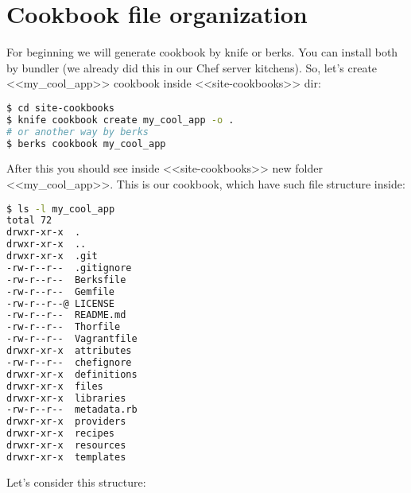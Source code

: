 \section{Cookbook file organization}
\label{sec:cookbook-files}

For beginning we will generate cookbook by knife or berks. You can install both by bundler (we already did this in our Chef server kitchens). So, let's create <<my\_cool\_app>> cookbook inside <<site-cookbooks>> dir:

\begin{lstlisting}[language=Bash,label=lst:cookbook-organization1]
$ cd site-cookbooks
$ knife cookbook create my_cool_app -o .
# or another way by berks
$ berks cookbook my_cool_app
\end{lstlisting}

After this you should see inside <<site-cookbooks>> new folder <<my\_cool\_app>>. This is our cookbook, which have such file structure inside:

\begin{lstlisting}[language=Bash,label=lst:cookbook-organization2]
$ ls -l my_cool_app
total 72
drwxr-xr-x  .
drwxr-xr-x  ..
drwxr-xr-x  .git
-rw-r--r--  .gitignore
-rw-r--r--  Berksfile
-rw-r--r--  Gemfile
-rw-r--r--@ LICENSE
-rw-r--r--  README.md
-rw-r--r--  Thorfile
-rw-r--r--  Vagrantfile
drwxr-xr-x  attributes
-rw-r--r--  chefignore
drwxr-xr-x  definitions
drwxr-xr-x  files
drwxr-xr-x  libraries
-rw-r--r--  metadata.rb
drwxr-xr-x  providers
drwxr-xr-x  recipes
drwxr-xr-x  resources
drwxr-xr-x  templates
\end{lstlisting}

Let's consider this structure:

